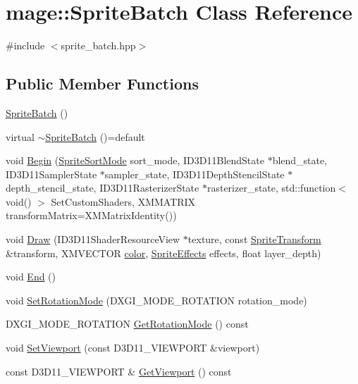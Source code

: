 \hypertarget{classmage_1_1_sprite_batch}{}\section{mage\+:\+:Sprite\+Batch Class Reference}
\label{classmage_1_1_sprite_batch}


{\ttfamily \#include $<$sprite\+\_\+batch.\+hpp$>$}

\subsection*{Public Member Functions}
\begin{DoxyCompactItemize}
\item 
\hyperlink{classmage_1_1_sprite_batch_a75924326627c792ff454d9d2a2ba1fda}{Sprite\+Batch} ()
\item 
virtual \hyperlink{classmage_1_1_sprite_batch_ab0e2b5af638de0a6a3bbcf2bba6c730a}{$\sim$\+Sprite\+Batch} ()=default
\item 
void \hyperlink{classmage_1_1_sprite_batch_acd323454aa86dfeb598e1c6ab573f68f}{Begin} (\hyperlink{namespacemage_a256fa5833eecc408923de7ffadb5e014}{Sprite\+Sort\+Mode} sort\+\_\+mode, I\+D3\+D11\+Blend\+State $\ast$blend\+\_\+state, I\+D3\+D11\+Sampler\+State $\ast$sampler\+\_\+state, I\+D3\+D11\+Depth\+Stencil\+State $\ast$depth\+\_\+stencil\+\_\+state, I\+D3\+D11\+Rasterizer\+State $\ast$rasterizer\+\_\+state, std\+::function$<$ void() $>$ Set\+Custom\+Shaders, X\+M\+M\+A\+T\+R\+IX transform\+Matrix=X\+M\+Matrix\+Identity())
\item 
void \hyperlink{classmage_1_1_sprite_batch_aa877dd94078b932b94c9f27e741dfa41}{Draw} (I\+D3\+D11\+Shader\+Resource\+View $\ast$texture, const \hyperlink{structmage_1_1_sprite_transform}{Sprite\+Transform} \&transform, X\+M\+V\+E\+C\+T\+OR \hyperlink{namespacemage_a56eceea5a9bceb2b56073f3ea4945781}{color}, \hyperlink{namespacemage_a06ff9ac76b1e0636cc8949c3f0d4ac46}{Sprite\+Effects} effects, float layer\+\_\+depth)
\item 
void \hyperlink{classmage_1_1_sprite_batch_a9764372bb18b1c24a4a2f64ab0649569}{End} ()
\item 
void \hyperlink{classmage_1_1_sprite_batch_a61ab7462374d9190220629be7827ba4b}{Set\+Rotation\+Mode} (D\+X\+G\+I\+\_\+\+M\+O\+D\+E\+\_\+\+R\+O\+T\+A\+T\+I\+ON rotation\+\_\+mode)
\item 
D\+X\+G\+I\+\_\+\+M\+O\+D\+E\+\_\+\+R\+O\+T\+A\+T\+I\+ON \hyperlink{classmage_1_1_sprite_batch_ade698c44432d175ca55a4545b9adae85}{Get\+Rotation\+Mode} () const
\item 
void \hyperlink{classmage_1_1_sprite_batch_aab9eab10e3ea1c62b483a67a47d9ccdc}{Set\+Viewport} (const D3\+D11\+\_\+\+V\+I\+E\+W\+P\+O\+RT \&viewport)
\item 
const D3\+D11\+\_\+\+V\+I\+E\+W\+P\+O\+RT \& \hyperlink{classmage_1_1_sprite_batch_a67bdd7fb00644aefb3c7ecfaa7923a39}{Get\+Viewport} () const
\end{DoxyCompactItemize}
